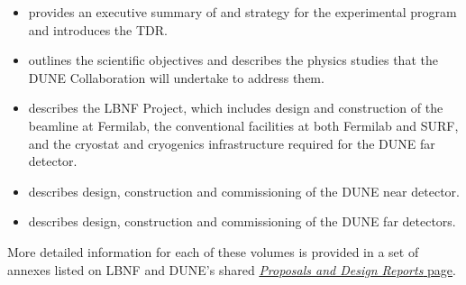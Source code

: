 \begin{itemize}
\item \volintro{}\cite{tdr-vol-1} provides an executive summary of and strategy for the experimental 
program and introduces the TDR.
\item \volphys{}\cite{tdr-vol-2} outlines the scientific objectives and describes the physics studies that 
the DUNE Collaboration will undertake to address them.
\item \vollbnf{}\cite{tdr-vol-3} describes the LBNF Project, which includes design and construction of the 
beamline at Fermilab, the conventional facilities at both Fermilab and SURF, and the cryostat
 and cryogenics infrastructure required for the DUNE far detector.
\item \voldunenear{}\cite{tdr-vol-4}  describes design, construction and 
commissioning of the DUNE near detector. 
\item \voldunefar{}\cite{tdr-vol-5}  describes design, construction and 
commissioning of the DUNE far detectors.
\end{itemize}

More detailed information for each of these volumes is provided in a set of annexes listed on LBNF and DUNE's shared  \href{https://web.fnal.gov/project/LBNF/SitePages/Proposals%20and%20Design%20Reports.aspx}{\textit{Proposals and Design Reports} page}. 


